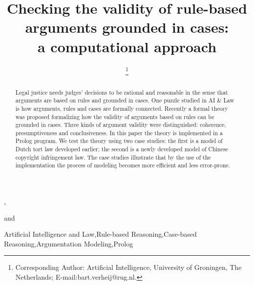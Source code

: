 \documentclass{IOS-Book-Article}
\begin{document}
\pagestyle{headings}
\def\thepage{}

\begin{frontmatter} 

\title{Checking the validity of rule-based arguments grounded in cases: \\a computational approach}


\author[A]{ }, \author[B]{ } and \author[A]{ \thanks{Corresponding Author: Artificial Intelligence, University of Groningen, The Netherlands; E-mail:bart.verheij@rug.nl.}}

\address[A]{Artificial Intelligence, University of Groningen, The Netherlands}
\address[B]{Institute of Logic and Cognition, Sun Yat-sen University, Guangzhou, China}

\begin{abstract}
Legal justice needs judges' decisions to be rational and reasonable in the sense that arguments are based on rules and grounded in cases.  One puzzle studied in AI \& Law is how arguments, rules and cases are formally connected. Recently a formal theory was proposed formalizing how the validity of arguments based on rules can be grounded in cases. Three kinds of argument validity were distinguished: coherence, presumptiveness and conclusiveness. In this paper the theory is implemented in a Prolog program. We test the theory using two case studies: the first is a model of Dutch tort law developed earlier; the second is a newly developed model of Chinese copyright infringement law. The case studies illustrate that by the use of the implementation the process of modeling becomes more efficient and less error-prone.
\end{abstract}

\begin{keyword}
Artificial Intelligence and Law\sep Rule-based Reasoning\sep Case-based Reasoning\sep Argumentation Modeling\sep Prolog
\end{keyword}
\end{frontmatter}
\end{document}
